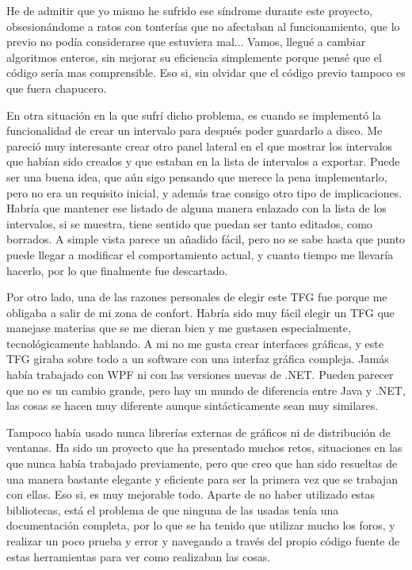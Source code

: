 He de admitir que yo mismo he sufrido ese s\'indrome durante este proyecto, obsesion\'andome a ratos con tonter\'ias
que no afectaban al funcionamiento, que lo previo no pod\'ia considerarse que estuviera mal... Vamos, llegu\'e a cambiar
algoritmos enteros, sin mejorar su eficiencia simplemente porque pens\'e que el c\'odigo ser\'ia mas comprensible. Eso si,
sin olvidar que el c\'odigo previo tampoco es que fuera chapucero.

En otra situaci\'on en la que sufr\'i dicho problema, es cuando se implement\'o la funcionalidad de crear un intervalo
para despu\'es poder guardarlo a disco. Me pareci\'o muy interesante crear otro panel lateral en el que mostrar los intervalos 
que hab\'ian sido creados y que estaban en la lista de intervalos a exportar. Puede ser una buena idea, que a\'un sigo pensando
que merece la pena implementarlo, pero no era un requisito inicial, y adem\'as trae consigo otro tipo de implicaciones. 
Habr\'ia que mantener ese listado de alguna manera enlazado con la lista de los intervalos, si se muestra, tiene sentido
que puedan ser tanto editados, como borrados. A simple vista parece un a\~nadido f\'acil, pero no se sabe hasta que punto
puede llegar a modificar el comportamiento actual, y cuanto tiempo me llevar\'ia hacerlo, por lo que finalmente
fue descartado.

Por otro lado, una de las razones personales de elegir este TFG fue porque me obligaba a salir de mi zona
de confort. Habr\'ia sido muy f\'acil elegir un TFG que manejase materias que se me dieran bien
y me gustasen especialmente, tecnol\'ogicamente hablando. A mi no me gusta crear interfaces gr\'aficas,
y este TFG giraba sobre todo a un software con una interfaz gr\'afica compleja. Jam\'as hab\'ia trabajado
con WPF ni con las versiones nuevas de .NET. Pueden parecer que no es un cambio grande, pero hay un mundo de
diferencia entre Java y .NET, las cosas se hacen muy diferente aunque sint\'acticamente sean muy similares.

Tampoco hab\'ia usado nunca librer\'ias externas de gr\'aficos ni de distribuci\'on de ventanas. Ha sido
un proyecto que ha presentado muchos retos, situaciones en las que nunca hab\'ia trabajado previamente,
pero que creo que han sido resueltas de una manera bastante elegante y eficiente para ser
la primera vez que se trabajan con ellas. Eso si, es muy mejorable todo. Aparte
de no haber utilizado estas bibliotecas, est\'a el problema de que ninguna de las usadas
ten\'ia una documentaci\'on completa, por lo que se ha tenido que utilizar mucho los foros,
y realizar un poco prueba y error y navegando a trav\'es del propio c\'odigo
fuente de estas herramientas para ver como realizaban las cosas.

